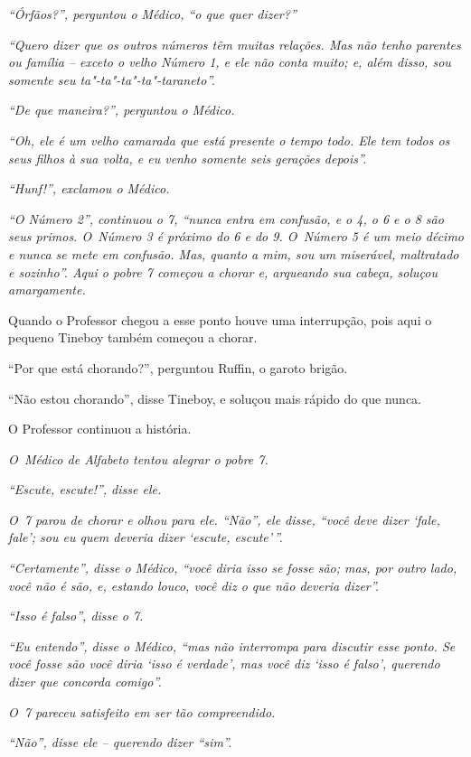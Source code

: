 \emph{``Órfãos?'', perguntou o Médico, ``o que quer dizer?''}

\emph{``Quero dizer que os outros números têm muitas relações. Mas não
tenho parentes ou família -- exceto o velho Número 1, e ele não conta
muito; e, além disso, sou somente seu ta"-ta"-ta"-ta"-taraneto''.}

\emph{``De que maneira?'', perguntou o Médico.}

\emph{``Oh, ele é um velho camarada que está presente o tempo todo. Ele
tem todos os seus filhos à sua volta, e eu venho somente seis gerações
depois''.}

\emph{``Hunf!'', exclamou o Médico.}

\emph{``O Número 2'', continuou o 7, ``nunca entra em confusão, e o 4, o
6 e o 8 são seus primos. O~Número 3 é próximo do 6 e do 9. O~Número 5 é
um meio décimo e nunca se mete em confusão. Mas, quanto a mim, sou um
miserável, maltratado e sozinho''. Aqui o pobre 7 começou a chorar e,
arqueando sua cabeça, soluçou amargamente.}

Quando o Professor chegou a esse ponto houve uma interrupção, pois aqui
o pequeno Tineboy também começou a chorar.

``Por que está chorando?'', perguntou Ruffin, o garoto brigão.

``Não estou chorando'', disse Tineboy, e soluçou mais rápido do que
nunca.

O Professor continuou a história.

\emph{O~Médico de Alfabeto tentou alegrar o pobre 7.}

\emph{``Escute, escute!'', disse ele.}

\emph{O~7 parou de chorar e olhou para ele. ``Não'', ele disse, ``você
deve dizer `fale, fale'; sou eu quem deveria dizer `escute,
escute'\,''.}

\emph{``Certamente'', disse o Médico, ``você diria isso se fosse são;
mas, por outro lado, você não é são, e, estando louco, você diz o que
não deveria dizer''.}

\emph{``Isso é falso'', disse o 7.}

\emph{``Eu entendo'', disse o Médico, ``mas não interrompa para discutir
esse ponto. Se você fosse são você diria `isso é verdade', mas você diz
`isso é falso', querendo dizer que concorda comigo''.}

\emph{O~7 pareceu satisfeito em ser tão compreendido.}

\emph{``Não'', disse ele -- querendo dizer ``sim''.}

